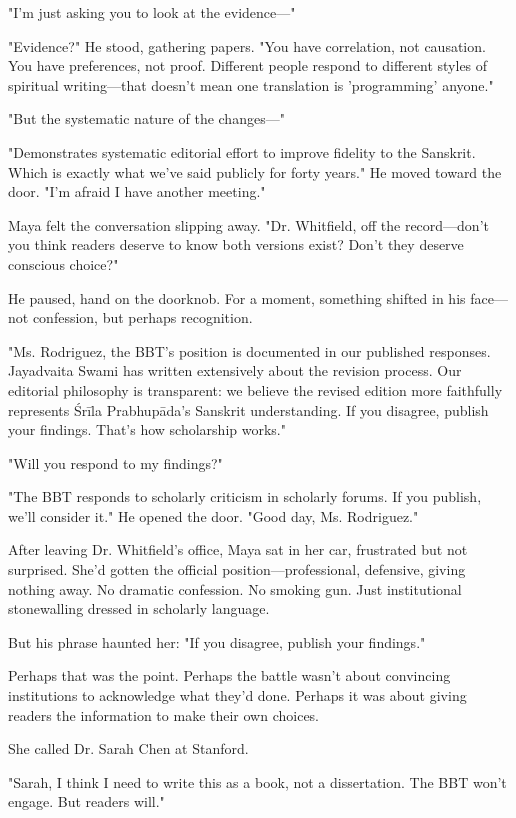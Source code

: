 \documentclass[12pt,twoside]{book}
\begin{document}
"I'm just asking you to look at the evidence—"

"Evidence?" He stood, gathering papers. "You have correlation, not causation. You have preferences, not proof. Different people respond to different styles of spiritual writing—that doesn't mean one translation is 'programming' anyone."

"But the systematic nature of the changes—"

"Demonstrates systematic editorial effort to improve fidelity to the Sanskrit. Which is exactly what we've said publicly for forty years." He moved toward the door. "I'm afraid I have another meeting."

Maya felt the conversation slipping away. "Dr. Whitfield, off the record—don't you think readers deserve to know both versions exist? Don't they deserve conscious choice?"

He paused, hand on the doorknob. For a moment, something shifted in his face—not confession, but perhaps recognition.

"Ms. Rodriguez, the BBT's position is documented in our published responses. Jayadvaita Swami has written extensively about the revision process. Our editorial philosophy is transparent: we believe the revised edition more faithfully represents Śrīla Prabhupāda's Sanskrit understanding. If you disagree, publish your findings. That's how scholarship works."

"Will you respond to my findings?"

"The BBT responds to scholarly criticism in scholarly forums. If you publish, we'll consider it." He opened the door. "Good day, Ms. Rodriguez."

After leaving Dr. Whitfield's office, Maya sat in her car, frustrated but not surprised. She'd gotten the official position—professional, defensive, giving nothing away. No dramatic confession. No smoking gun. Just institutional stonewalling dressed in scholarly language.

But his phrase haunted her: "If you disagree, publish your findings."

Perhaps that was the point. Perhaps the battle wasn't about convincing institutions to acknowledge what they'd done. Perhaps it was about giving readers the information to make their own choices.

She called Dr. Sarah Chen at Stanford.

"Sarah, I think I need to write this as a book, not a dissertation. The BBT won't engage. But readers will."
\end{document}
